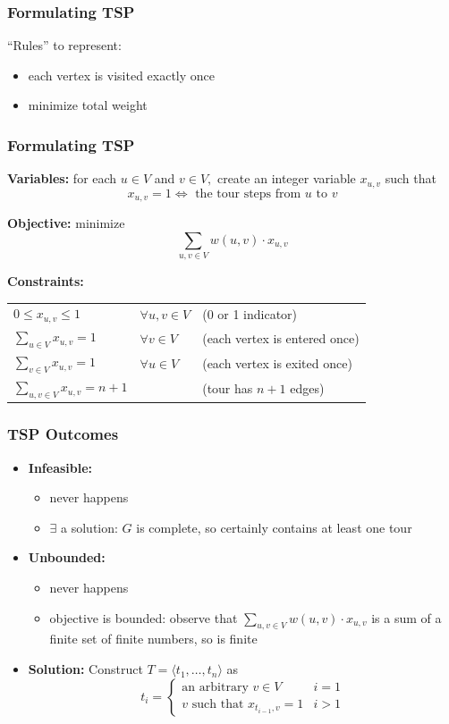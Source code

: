 \documentclass{beamer}
\begin{document}
  \begin{frame} \frametitle{Formulating TSP}
    ``Rules'' to represent:
      \begin{itemize}
        \item each vertex is visited exactly once
        \item minimize total weight
      \end{itemize}
  \end{frame}
  
  \begin{frame} \frametitle{Formulating TSP}
  \textbf{Variables:} for each $u \in V$ and $v \in V,$ create an integer variable $x_{u, v}$ such that
  \[ x_{u,v} = 1 \Leftrightarrow \text{ the tour steps from } u \text{ to } v \]
  
  \textbf{Objective:} minimize
  \[ \sum_{u, v \in V} w(u, v) \cdot x_{u, v} \]
  
  \textbf{Constraints:}
  \begin{tabular}{lll}
    $0 \leq x_{u, v} \leq 1$ & $\forall u, v \in V$ & (0 or 1 indicator) \\
    $\sum_{u \in V} x_{u, v} = 1 $ & $\forall v \in V$ & (each vertex is entered once) \\
    $\sum_{v \in V} x_{u, v} = 1 $ & $\forall u \in V$ & (each vertex is exited once) \\
    $\sum_{u, v \in V} x_{u, v} = n+1$ & & (tour has $n+1$ edges) 
  \end{tabular}
  
  \end{frame}
  
  \begin{frame} \frametitle{TSP Outcomes}
    \begin{itemize}
      \item \textbf{Infeasible:}
        \begin{itemize}
        \item never happens
        \item $\exists$ a solution: $G$ is complete, so certainly contains at least one tour
        \end{itemize}
      \item \textbf{Unbounded:}
      \begin{itemize}
        \item never happens
        \item objective is bounded: observe that $\sum_{u, v \in V} w(u, v) \cdot x_{u, v}$
          is a sum of a finite set of finite numbers, so is finite
      \end{itemize}
      \item \textbf{Solution:} Construct $T=\langle t_1, \ldots, t_n \rangle$ as
       \[
        t_i =
        \begin{cases}
          \text{an arbitrary } v \in V & i=1 \\
          v \text{ such that } x_{t_{i-1}, v}=1 & i>1 
        \end{cases}
       \]
      \end{itemize}
    \end{frame}
  
\end{document}
